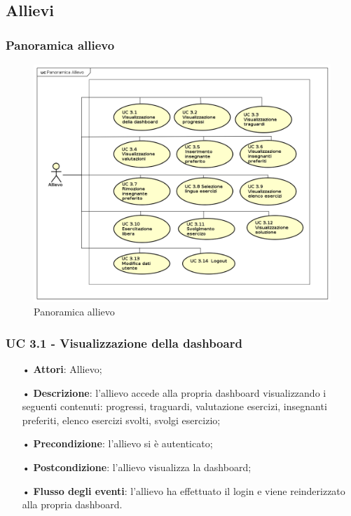 \subsection{Allievi}
\subsubsection{Panoramica allievo}

\begin{figure}[H]
\centering
\includegraphics[width=17cm]{img/PanoramicaAllievi.png} 
\caption{Panoramica allievo}\label{fig:31}
\end{figure}


\subsubsection{UC 3.1 - Visualizzazione della dashboard}
\begin{itemize}
\item[•]\textbf{Attori}: Allievo;
\item[•]\textbf{Descrizione}: l'allievo accede alla propria dashboard visualizzando i seguenti contenuti: progressi, traguardi, valutazione esercizi, insegnanti preferiti, elenco esercizi svolti, svolgi esercizio;
\item[•]\textbf{Precondizione}: l'allievo si è autenticato;
\item[•]\textbf{Postcondizione}: l'allievo visualizza la dashboard;
\item[•]\textbf{Flusso degli eventi}: l'allievo ha effettuato il login e viene reinderizzato alla propria dashboard.
\end{itemize}

